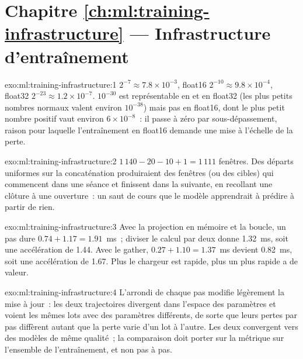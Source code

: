 \section*{Chapitre \ref{ch:ml:training-infrastructure} --- Infrastructure d'entraînement}

\begin{solution}{exo:ml:training-infrastructure:1}
 $2^{-7}\approx7.8\times10^{-3}$, float16 $2^{-10}\approx9.8\times10^{-4}$, float32 $2^{-23}\approx1.2\times10^{-7}$.
$10^{-30}$ est représentable en  et en float32 (les plus petits nombres normaux valent environ $10^{-38}$) mais pas en float16, dont
le plus petit nombre positif vaut environ $6\times10^{-8}$~: il passe à zéro par sous-dépassement, raison pour laquelle l'entraînement en float16 demande une mise à l'échelle de la perte.
\end{solution}

\begin{solution}{exo:ml:training-infrastructure:2}
$1\,140 - 20 - 10 + 1 = 1\,111$ fenêtres. Des départs uniformes sur la concaténation produiraient des fenêtres (ou des cibles) qui commencent dans une
séance et finissent dans la suivante, en recollant une clôture à une ouverture~: un saut de cours que le modèle apprendrait à prédire à partir de rien.
\end{solution}

\begin{solution}{exo:ml:training-infrastructure:3}
Avec la projection en mémoire et la boucle, un pas dure $0.74 + 1.17 = 1.91$~ms~; diviser le calcul par deux donne 1.32~ms, soit une accélération de 1.44. Avec le
gather, $0.27 + 1.10 = 1.37$~ms devient 0.82~ms, soit une accélération de 1.67. Plus le chargeur est rapide, plus un  plus rapide a de valeur.
\end{solution}

\begin{solution}{exo:ml:training-infrastructure:4}
L'arrondi de chaque pas modifie légèrement la mise à jour~: les deux trajectoires divergent dans l'espace des paramètres et voient les mêmes lots avec
des paramètres différents, de sorte que leurs pertes par pas diffèrent autant que la perte varie d'un lot à l'autre. Les deux convergent vers
des modèles de même qualité~; la comparaison doit porter sur la métrique sur l'ensemble de l'entraînement, et non pas à pas.
\end{solution}

